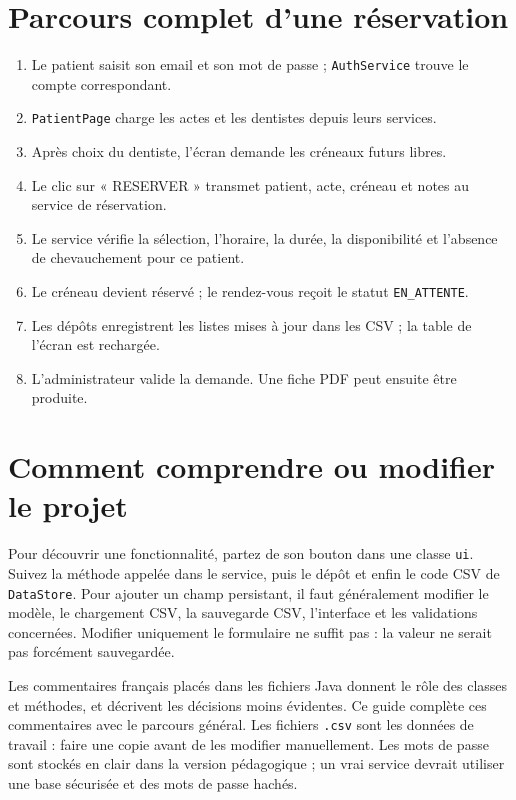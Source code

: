 \documentclass[11pt,a4paper]{report}
\begin{document}
\chapter{Parcours complet d'une réservation}
\begin{enumerate}
\item Le patient saisit son email et son mot de passe ; \texttt{AuthService} trouve le compte correspondant.
\item \texttt{PatientPage} charge les actes et les dentistes depuis leurs services.
\item Après choix du dentiste, l'écran demande les créneaux futurs libres.
\item Le clic sur « RESERVER » transmet patient, acte, créneau et notes au service de réservation.
\item Le service vérifie la sélection, l'horaire, la durée, la disponibilité et l'absence de chevauchement pour ce patient.
\item Le créneau devient réservé ; le rendez-vous reçoit le statut \texttt{EN\_ATTENTE}.
\item Les dépôts enregistrent les listes mises à jour dans les CSV ; la table de l'écran est rechargée.
\item L'administrateur valide la demande. Une fiche PDF peut ensuite être produite.
\end{enumerate}

\chapter{Comment comprendre ou modifier le projet}
Pour découvrir une fonctionnalité, partez de son bouton dans une classe \texttt{ui}. Suivez la méthode appelée dans le service, puis le dépôt et enfin le code CSV de \texttt{DataStore}. Pour ajouter un champ persistant, il faut généralement modifier le modèle, le chargement CSV, la sauvegarde CSV, l'interface et les validations concernées. Modifier uniquement le formulaire ne suffit pas : la valeur ne serait pas forcément sauvegardée.

Les commentaires français placés dans les fichiers Java donnent le rôle des classes et méthodes, et décrivent les décisions moins évidentes. Ce guide complète ces commentaires avec le parcours général. Les fichiers \texttt{.csv} sont les données de travail : faire une copie avant de les modifier manuellement. Les mots de passe sont stockés en clair dans la version pédagogique ; un vrai service devrait utiliser une base sécurisée et des mots de passe hachés.
\end{document}
